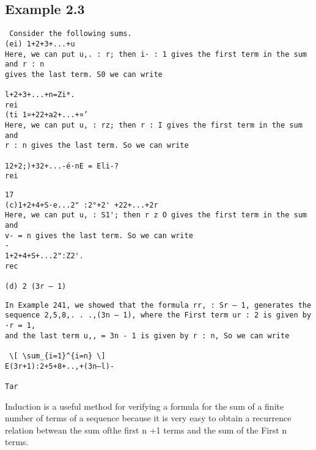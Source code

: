 \documentclass[]{article}
\begin{document}
\subsection*{Example 2.3}
\begin{verbatim}
 Consider the following sums.
(ei) 1+2+3+...+u
Here, we can put u,. : r; then i· : 1 gives the first term in the sum and r : n
gives the last term. S0 we can write
 
l+2+3+...+n=Zi*.
rei
(ti 1¤+22+a2+...+¤’
Here, we can put u, : rz; then r : I gives the first term in the sum and
r : n gives the last term. So we can write
 
12+2;)+32+...-é·nE = Eli-?
rei
\end{verbatim}
\begin{verbatim}
17
(c)1+2+4+S·e...2" :2°+2' +22+...+2r
Here, we can put u, : S1'; then r z O gives the first term in the sum and
v- = n gives the last term. So we can write
-  
1+2+4+S+...2":Z2'.
rec
 
(d) 2 (3r — 1)
\end{verbatim}
\begin{verbatim}
In Example 241, we showed that the formula rr, : Sr — 1, generates the
sequence 2,5,8,. . .,(3n — 1), where the First term ur : 2 is given by ·r = 1,
and the last term u,, = 3n - 1 is given by r : n, So we can write
 
 \[ \sum_{i=1}^{i=n} \]
E(3r+1):2+5+8+..,+(3n—l)-

Tar
\end{verbatim}

Induction is a useful method for verifying a formula for the sum of a finite number
of terms of a sequence because it is very easy to obtain a recurrence relation betwean
the sum ofthe first n +1 terms and the sum of the First n terms. 
\end{document}
